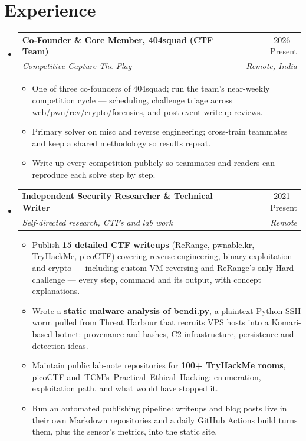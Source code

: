 \documentclass[letterpaper,11pt]{article}
\makeatletter
\newcommand{\resumeItem}[1]{
  \item\small{
    {#1\vspace{-2pt}}
  }
}
\newcommand{\resumeSubheading}[4]{
  \vspace{-2pt}\item
    \begin{tabular*}{\linewidth}[t]{l@{\extracolsep{\fill}}r}
      \textbf{#1} & #2 \\
      \textit{\small#3} & \textit{\small#4} \\
    \end{tabular*}\vspace{-7pt}
}
\newcommand{\resumeSubHeadingListStart}{\begin{itemize}[leftmargin=0.15in, label={}]}
\newcommand{\resumeSubHeadingListEnd}{\end{itemize}}
\newcommand{\resumeItemListStart}{\begin{itemize}}
\newcommand{\resumeItemListEnd}{\end{itemize}\vspace{-5pt}}
\makeatother
\begin{document}
\section{Experience}
  \resumeSubHeadingListStart

    \resumeSubheading
      {Co-Founder \& Core Member, 404squad (CTF Team)}{2026 -- Present}
      {Competitive Capture The Flag}{Remote, India}
      \resumeItemListStart
        \resumeItem{One of three co-founders of 404squad; run the team's near-weekly competition cycle --- scheduling, challenge triage across web/pwn/rev/crypto/forensics, and post-event writeup reviews.}
        \resumeItem{Primary solver on misc and reverse engineering; cross-train teammates and keep a shared methodology so results repeat.}
        \resumeItem{Write up every competition publicly so teammates and readers can reproduce each solve step by step.}
      \resumeItemListEnd

    \resumeSubheading
      {Independent Security Researcher \& Technical Writer}{2021 -- Present}
      {Self-directed research, CTFs and lab work}{Remote}
      \resumeItemListStart
        \resumeItem{Publish \textbf{15 detailed CTF writeups} (ReRange, pwnable.kr, TryHackMe, picoCTF) covering reverse engineering, binary exploitation and crypto --- including custom-VM reversing and ReRange's only Hard challenge --- every step, command and its output, with concept explanations.}
        \resumeItem{Wrote a \textbf{static malware analysis of bendi.py}, a plaintext Python SSH worm pulled from Threat Harbour that recruits VPS hosts into a Komari-based botnet: provenance and hashes, C2 infrastructure, persistence and detection ideas.}
        \resumeItem{Maintain public lab-note repositories for \textbf{100+ TryHackMe rooms}, picoCTF \mbox{and TCM's Practical Ethical Hacking}: enumeration, exploitation path, and what would have stopped it.}
        \resumeItem{Run an automated publishing pipeline: writeups and blog posts live in their own Markdown repositories and a daily GitHub Actions build turns them, plus the sensor's metrics, into the static site.}
      \resumeItemListEnd

  \resumeSubHeadingListEnd


\end{document}
